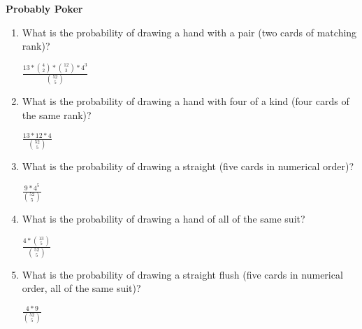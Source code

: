 \question \textbf{Probably Poker}
\begin{enumerate}[label=(\alph*)]
\item What is the probability of drawing a hand with a pair (two cards of matching rank)?
\begin{solution}[2cm]
$ \frac{13 * {4 \choose 2} * {12 \choose 3} * 4^3}{{52 \choose 5}}$ 
\end{solution}
 
\item What is the probability of drawing a hand with four of a kind (four cards of the same rank)?
\begin{solution}[2cm]
$\frac{ 13 * 12 * 4}{{52 \choose 5}}$
 \end{solution}
 
\item What is the probability of drawing a straight (five cards in numerical order)? 
\begin{solution}[2cm]
$\frac{ 9 * 4^5}{{52 \choose 5}}$
 \end{solution}
 
\item What is the probability of drawing a hand of all of the same suit? 
\begin{solution}[2cm]
$\frac{4 * {13 \choose 5}}{{52 \choose 5}}$
 \end{solution}
 
\item What is the probability of drawing a straight flush (five cards in numerical order, all of the same suit)? 
\begin{solution}[2cm]
$\frac{4 * 9}{{52 \choose 5}}$
 \end{solution}
\end{enumerate}